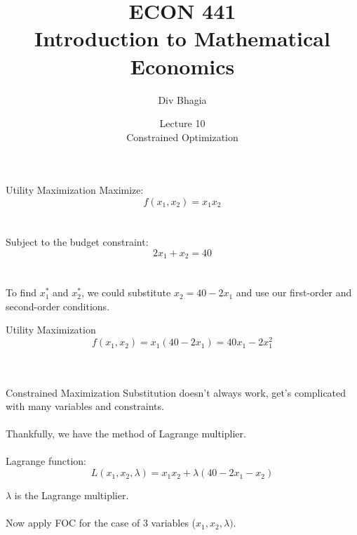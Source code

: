 \documentclass{./../../Latex/teaching_slides}
\begin{document}
\title{ECON 441 \\ \vspace{0.4em} \normalsize Introduction to Mathematical Economics}
\author{Div Bhagia}
\date{Lecture 10 \\ Constrained Optimization}

\begin{frame}
\maketitle
\end{frame}

\begin{frame}{Utility Maximization}
Maximize:
$$ f(x_1, x_2) = x_1 x_2  $$ \\~\\

Subject to the budget constraint:
$$ 2x_1 + x_2 = 40 $$ \\~\\
 
To find $x_1^*$ and $x_2^*$, we could substitute $x_2=40-2x_1$ and use our first-order and second-order conditions.
\end{frame}

\begin{frame}{Utility Maximization}
\vspace{-1.5em}
$$ f(x_1, x_2) = x_1 (40-2x_1)=40x_1-2x_1^2  $$ \\~\\
\end{frame}

\begin{frame}{Constrained Maximization}
Substitution doesn't always work, get's complicated with many variables and constraints. \\~\\

Thankfully, we have the method of Lagrange multiplier. \\~\\
Lagrange function:
$$ L(x_1, x_2, \lambda) = x_1 x_2 + \lambda(40-2x_1-x_2) $$

$\lambda$ is the Lagrange multiplier.  \\~\\

Now apply FOC for the case of 3 variables ($x_1, x_2, \lambda)$. 
\end{frame}
\end{document}
